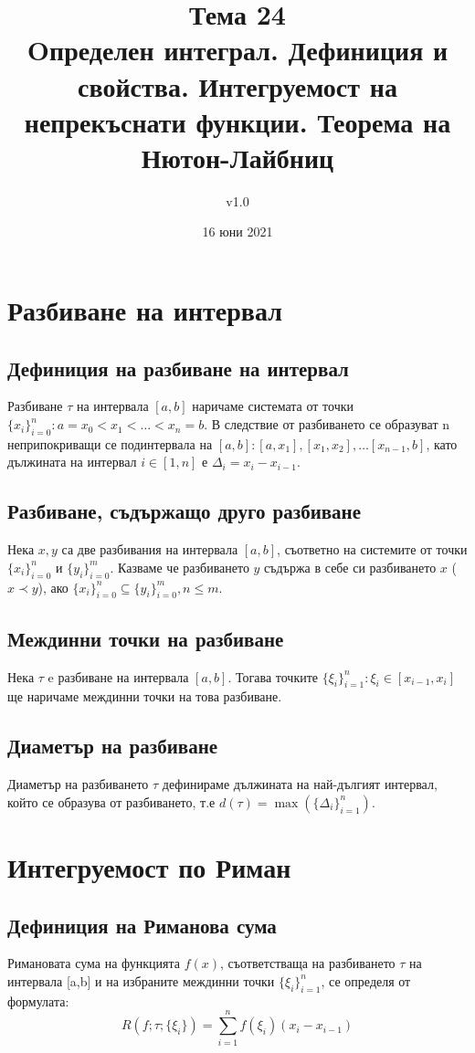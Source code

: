 \documentclass[fleqn,12pt]{article}
\title{Тема 24\\ Oпределен  интеграл.  Дефиниция  и  свойства.  Интегруемост  на непрекъснати функции. Теорема на Нютон-Лайбниц}
\author{v1.0}
\date{16 юни 2021}
\begin{document}
\maketitle

\tableofcontents
\pagebreak

\section{Разбиване на интервал}

\subsection{Дефиниция на разбиване на интервал}
Разбиване $\tau$ на интервала $[a,b]$ наричаме системата от точки $\{x_i\}_{i=0}^n : a = x_0 < x_1 < \dots < x_n = b$. В следствие от разбиването
се образуват n неприпокриващи се подинтервала на $[a,b] : [a, x_1], [x_1, x_2], \dots [x_{n-1}, b]$, като дължината на интервал $i \in [1,n]$ е $\Delta_i = x_i - x_{i-1}$.

\subsection{Разбиване, съдържащо друго разбиване}
Нека $x,y$ са две разбивания на интервала $[a,b]$, съответно на системите от точки $\{x_i\}_{i=0}^{n}$ и  $\{y_i\}_{i=0}^{m}$. Казваме че разбиването $y$ съдържа в себе си разбиването $x$ ($x \prec y$), ако
$\{x_i\}_{i=0}^{n} \subseteq  \{y_i\}_{i=0}^{m}, n \leq m$.

\subsection{Междинни точки на разбиване}
Нека $\tau$ e разбиване на интервала $[a,b]$. Тогава точките $\{\xi_i\}_{i=1}^n : \xi_i \in [x_{i-1},x_i]$ ще наричаме междинни точки на това разбиване.

\subsection{Диаметър на разбиване}
Диаметър на разбиването $\tau$ дефинираме дължината на най-дългият интервал, който се образува от разбиването, т.е $d(\tau)=\max(\{\Delta_i\}_{i=1}^n)$.

\section{Интегруемост по Риман}
\subsection{Дефиниция на Риманова сума}
Римановата сума на функцията $f(x)$, съответстваща на разбиването $\tau$ на интервала [a,b] и на избраните междинни точки $\{\xi_i\}_{i=1}^n$, се определя от формулата: 
\[ R(f;\tau;\{\xi_i\})=\sum_{i = 1}^{n} f(\xi_i)(x_i-x_{i-1}) \] 
\end{document}
